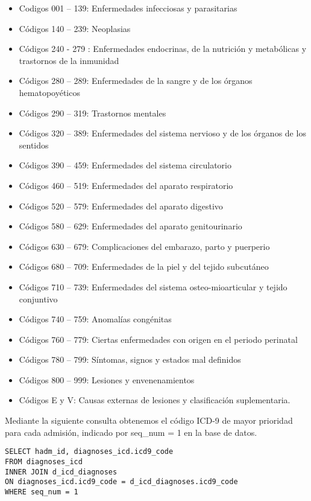 \documentclass{report}
\begin{document}
\begin{itemize}
\item
  Codigos 001 -- 139: Enfermedades infecciosas y parasitarias
\item
  Códigos 140 -- 239: Neoplasias
\item
  Códigos 240 - 279 : Enfermedades endocrinas, de la nutrición y
  metabólicas y trastornos de la inmunidad
\item
  Códigos 280 -- 289: Enfermedades de la sangre y de los órganos
  hematopoyéticos
\item
  Códigos 290 -- 319: Trastornos mentales
\item
  Códigos 320 -- 389: Enfermedades del sistema nervioso y de los órganos
  de los sentidos
\item
  Códigos 390 -- 459: Enfermedades del sistema circulatorio
\item
  Códigos 460 -- 519: Enfermedades del aparato respiratorio
\item
  Códigos 520 -- 579: Enfermedades del aparato digestivo
\item
  Códigos 580 -- 629: Enfermedades del aparato genitourinario
\item
  Códigos 630 -- 679: Complicaciones del embarazo, parto y puerperio
\item
  Códigos 680 -- 709: Enfermedades de la piel y del tejido subcutáneo
\item
  Códigos 710 -- 739: Enfermedades del sistema osteo-mioarticular y
  tejido conjuntivo
\item
  Códigos 740 -- 759: Anomalías congénitas
\item
  Códigos 760 -- 779: Ciertas enfermedades con origen en el periodo
  perinatal
\item
  Códigos 780 -- 799: Síntomas, signos y estados mal definidos
\item
  Códigos 800 -- 999: Lesiones y envenenamientos
\item
  Códigos E y V: Causas externas de lesiones y clasificación
  suplementaria. 
\end{itemize}

Mediante la siguiente consulta obtenemos el código ICD-9 de mayor
prioridad para cada admisión, indicado por seq\_num = 1 en la base de datos.

\begin{verbatim}
SELECT hadm_id, diagnoses_icd.icd9_code
FROM diagnoses_icd  
INNER JOIN d_icd_diagnoses 
ON diagnoses_icd.icd9_code = d_icd_diagnoses.icd9_code 
WHERE seq_num = 1
\end{verbatim}
\end{document}
